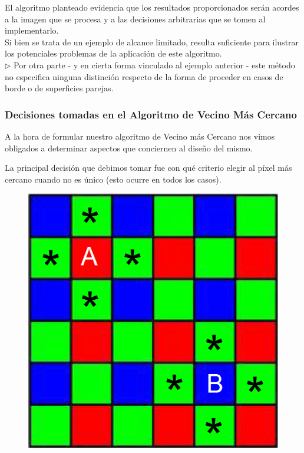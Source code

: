\documentclass[a4paper]{article}
\begin{document}
El algoritmo planteado evidencia que los resultados proporcionados serán acordes a la imagen que se procesa y a las decisiones arbitrarias que se tomen al implementarlo. \\

Si bien se trata de un ejemplo de alcance limitado, resulta suficiente para ilustrar los potenciales problemas de la aplicación de este algoritmo.\\



$\triangleright$ Por otra parte - y en cierta forma vinculado al ejemplo anterior - este método no especifica ninguna distinción respecto de la forma de proceder en casos de borde o de superficies parejas. \\


\newpage
\subsubsection*{Decisiones tomadas en el Algoritmo de Vecino M\'as Cercano}

A la hora de formular nuestro algoritmo de Vecino m\'as Cercano nos vimos obligados a determinar aspectos que conciernen al dise\~no del mismo. 

La principal decisi\'on que debimos tomar fue con qu\'e criterio elegir al p\'ixel m\'as cercano cuando no es \'unico (esto ocurre en todos los casos). 

\begin{figure}[h!]
	\caption{}
	\begin{center}
	\includegraphics[scale=0.36]{imagenes/vecino1}
	\label{Vecino1}
  \end{center}
\end{figure}
\end{document}
